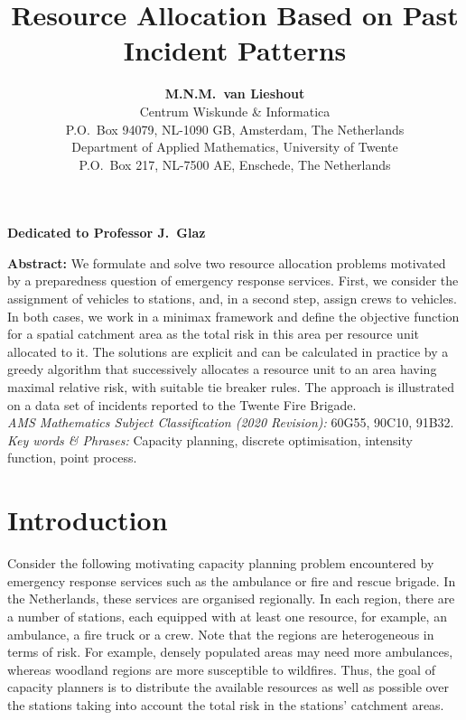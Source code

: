 \documentclass[twoside,11pt]{article}
\begin{document}
\pagestyle{myheadings}

\title{{\bf Resource Allocation Based on Past Incident Patterns}}
\author{{\bf M.N.M.\ van Lieshout}\\[0.1in]
Centrum Wiskunde \& Informatica \\
P.O.\ Box 94079, NL-1090 GB, Amsterdam, The Netherlands\\[0.1in]
Department of Applied Mathematics, University of Twente \\
P.O.\ Box 217, NL-7500 AE, Enschede, The Netherlands}
\date{}

\maketitle

\begin{center}
    {\bf Dedicated to Professor J.\ Glaz}
\end{center}

\noindent
{\bf Abstract:} 
We formulate and solve two resource allocation problems
motivated by a preparedness question of emergency response services. 
First, we consider the assignment of vehicles to stations, and, in a 
second step, assign crews to vehicles. In both cases, we work in a 
minimax framework and define the objective function for a spatial 
catchment area as the total risk in this area per resource unit 
allocated to it. The solutions are explicit and can be calculated in 
practice by a greedy algorithm that successively allocates a resource 
unit to an area having maximal relative risk, with suitable tie breaker 
rules. The approach is illustrated on a data set of incidents reported
to the Twente Fire Brigade.  \\[0.1in]

\noindent
{\em AMS Mathematics Subject Classification (2020 Revision):}
60G55, 90C10, 91B32.
\\
\noindent
{\em Key words \& Phrases:} 
Capacity planning, discrete optimisation, intensity function, point process.

\section{Introduction}

Consider the following motivating capacity planning problem
encountered by emergency response services such as the ambulance 
or fire and rescue brigade. In the Netherlands, these services are 
organised regionally. In each region, there are a number of stations, 
each equipped with at least one resource, for example, an ambulance, a
fire truck or a crew. Note that the regions are heterogeneous in terms of 
risk. For example, densely populated areas may need more ambulances, 
whereas woodland regions are more susceptible to wildfires. Thus,
the goal of capacity planners is to distribute the available resources 
as well as possible over the stations taking into account the total
risk in the stations' catchment areas.  
\end{document}
